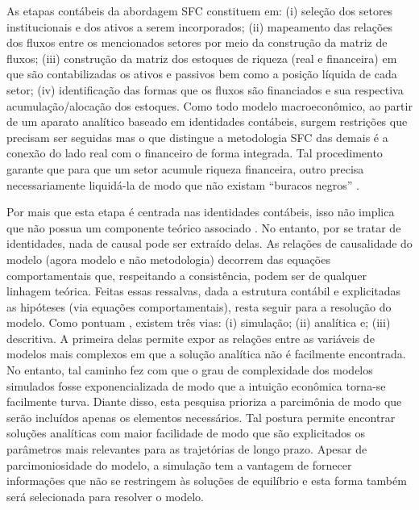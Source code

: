 


As etapas contábeis da abordagem SFC constituem em: (i) seleção dos setores institucionais e dos ativos a serem incorporados; (ii) mapeamento das relações dos fluxos entre os mencionados setores por meio da construção da matriz de fluxos; (iii) construção da matriz dos estoques de riqueza (real e financeira) em que são contabilizadas os ativos e passivos  bem como a posição líquida de cada setor; (iv) identificação das formas que os fluxos são financiados e sua respectiva acumulação/alocação dos estoques. 
Como todo modelo macroeconômico, ao partir de um aparato analítico
baseado em identidades contábeis, surgem restrições que precisam ser seguidas mas o que distingue
a metodologia SFC das demais é a conexão do lado real com o financeiro de forma integrada.
Tal procedimento garante que para que um setor acumule riqueza financeira, outro precisa necessariamente liquidá-la de modo que não existam ``buracos negros'' \cite{godley_money_1996}.

Por mais que esta etapa é centrada nas identidades contábeis, isso não implica que não possua um componente teórico associado \cite[p.~15--16]{macedo_e_silva_peering_2011}.  No entanto, por se tratar de identidades, nada de causal pode ser extraído delas. As relações de causalidade do modelo (agora modelo e não metodologia) decorrem das equações comportamentais que, respeitando a consistência, podem ser de qualquer linhagem teórica. Feitas essas ressalvas, dada a estrutura contábil e explicitadas as hipóteses (via equações comportamentais), resta seguir para a resolução do modelo. Como pontuam \textcite{caverzasi_stock-flow_2013}, existem três vias: (i) simulação; (ii) analítica e; (iii) descritiva. A primeira delas permite expor as relações entre as variáveis de modelos mais complexos em que a solução analítica não é facilmente encontrada. No entanto, tal caminho fez com que o grau de complexidade dos modelos simulados fosse exponencializada de modo que a intuição econômica torna-se facilmente turva.  
Diante disso, esta pesquisa prioriza a parcimônia de modo que serão incluídos apenas os elementos necessários.
Tal postura permite encontrar soluções analíticas com maior facilidade de modo que são explicitados os parâmetros mais relevantes para as
trajetórias de longo prazo. 
Apesar de parcimoniosidade do modelo, a simulação tem a vantagem de fornecer informações que não se restringem às soluções de equilíbrio e esta forma também será selecionada para resolver o modelo. 
